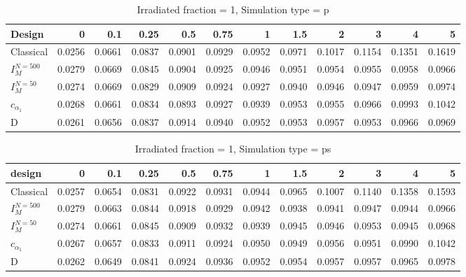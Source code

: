 \documentclass[a4paper]{article}
\begin{document}
\begin{table}[ht]
\centering
\begin{tabular}{lrrrrrrrrrrr}
  \hline
Design & 0 & 0.1 & 0.25 & 0.5 & 0.75 & 1 & 1.5 & 2 & 3 & 4 & 5 \\ 
  \hline
Classical & 0.0256 & 0.0661 & 0.0837 & 0.0901 & 0.0929 & 0.0952 & 0.0971 & 0.1017 & 0.1154 & 0.1351 & 0.1619 \\ 
  $I_M^{N=500}$ & 0.0279 & 0.0669 & 0.0845 & 0.0904 & 0.0925 & 0.0946 & 0.0951 & 0.0954 & 0.0955 & 0.0958 & 0.0966 \\ 
  $I_M^{N=50}$ & 0.0274 & 0.0669 & 0.0829 & 0.0909 & 0.0924 & 0.0927 & 0.0940 & 0.0946 & 0.0947 & 0.0959 & 0.0974 \\ 
  $c_{\alpha_1}$ & 0.0268 & 0.0661 & 0.0834 & 0.0893 & 0.0927 & 0.0939 & 0.0953 & 0.0955 & 0.0966 & 0.0993 & 0.1042 \\ 
  D & 0.0261 & 0.0656 & 0.0837 & 0.0914 & 0.0940 & 0.0952 & 0.0953 & 0.0957 & 0.0953 & 0.0966 & 0.0969 \\ 
   \hline
\end{tabular}
\caption{Irradiated fraction = 1, Simulation type = p} 
\end{table}

\begin{table}[ht]
\centering
\begin{tabular}{lrrrrrrrrrrr}
  \hline
design & 0 & 0.1 & 0.25 & 0.5 & 0.75 & 1 & 1.5 & 2 & 3 & 4 & 5 \\ 
  \hline
Classical & 0.0257 & 0.0654 & 0.0831 & 0.0922 & 0.0931 & 0.0944 & 0.0965 & 0.1007 & 0.1140 & 0.1358 & 0.1593 \\ 
  $I_M^{N=500}$ & 0.0279 & 0.0663 & 0.0844 & 0.0918 & 0.0929 & 0.0942 & 0.0938 & 0.0941 & 0.0947 & 0.0944 & 0.0966 \\ 
  $I_M^{N=50}$ & 0.0274 & 0.0661 & 0.0845 & 0.0909 & 0.0932 & 0.0939 & 0.0945 & 0.0946 & 0.0953 & 0.0945 & 0.0968 \\ 
  $c_{\alpha_1}$ & 0.0267 & 0.0657 & 0.0833 & 0.0911 & 0.0924 & 0.0950 & 0.0949 & 0.0956 & 0.0951 & 0.0990 & 0.1042 \\ 
  D & 0.0262 & 0.0649 & 0.0841 & 0.0924 & 0.0936 & 0.0952 & 0.0954 & 0.0957 & 0.0957 & 0.0965 & 0.0978 \\ 
   \hline
\end{tabular}
\caption{Irradiated fraction = 1, Simulation type = ps} 
\end{table}
\end{document}

